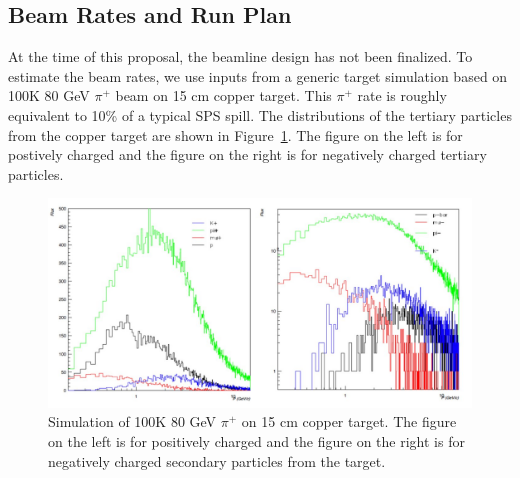 

\subsection{Beam Rates and Run Plan}
At the time of this proposal, the beamline design has not been finalized. To estimate the beam rates, we use inputs from a generic target simulation based on 100K 80 GeV $\pi^+$ beam on 15 cm copper target. This $\pi^+$ rate is roughly equivalent to 10\% of a typical SPS spill. The distributions of the tertiary particles from the copper target are shown in Figure~\ref{fig:PionOnCuTarget}. The figure on the left is for postively charged and the figure on the right is for negatively charged tertiary particles. 

\begin{figure}[tbh]
  \centering
\includegraphics[scale=0.47]{figures/80GeVPion-15cmCuTarget.jpg}
  \caption{Simulation of 100K 80 GeV $\pi^+$ on 15 cm copper target. The figure on the left is for positively charged and the figure on the right is for negatively charged secondary particles from the target. }
\label{fig:PionOnCuTarget}
\end{figure}

